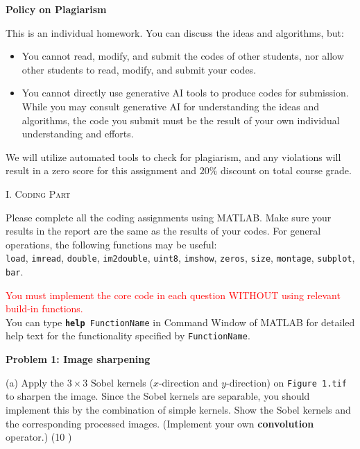 \documentclass[A4paper, 11pt]{article}
\newcommand{\<}{\,\langle\,}
\renewcommand{\>}{\,\rangle}
\newcommand{\Pro}[1]{\textbf{\large{Problem #1}} \vspace*{1ex}}
\newcommand{\Pt}[1]{\textcolor{emph}{(#1 \ifthenelse{\equal{#1}{1}}{point}{points})}}
\newcommand{\0}{\mathbf{0}}
\newcommand{\1}{\mathbf{1}}
\begin{document}
\begin{spacing}{1.3}
\vspace*{2ex}
\textbf{\large{Policy on Plagiarism}}
\vspace*{1.5ex}

This is an individual homework. You can discuss the ideas and algorithms, but:
\begin{itemize} \setlength{\parskip}{0.5ex} \vspace*{-1.5ex}
    \item You cannot read, modify, and submit the codes of other students, nor allow other students to read, modify, and submit your codes.
    \item You cannot directly use generative AI tools to produce codes for submission. While you may consult generative AI for understanding the ideas and algorithms, the code you submit must be the result of your own individual understanding and efforts.
\end{itemize} \vspace*{-1.5ex}
We will utilize automated tools to check for plagiarism, and any violations will result in a zero score for this assignment and $20\%$ discount on total course grade.

\newpage

\begin{center}
    \textsc{I. Coding Part}
\end{center}

Please complete all the coding assignments using MATLAB. Make sure your results in the report are the same as the results of your codes. For general operations, the following functions may be useful:\\
\texttt{load}, \texttt{imread}, \texttt{double}, \texttt{im2double}, \texttt{uint8}, \texttt{imshow}, \texttt{zeros}, \texttt{size}, \texttt{montage}, \texttt{subplot}, \texttt{bar}.

\textcolor{red}{You must implement the core code in each question WITHOUT using relevant build-in functions.}\\


\vspace*{-3.75ex}
You can type \texttt{\textbf{help} FunctionName} in Command Window of MATLAB for detailed help text for the functionality specified by \texttt{FunctionName}.

\vspace*{6ex}

\Pro{1: Image sharpening}

(a) Apply the $3\times 3$ Sobel kernels ($x$-direction and $y$-direction) on \texttt{Figure 1.tif} to sharpen the image. Since the Sobel kernels are separable, you should implement this by the combination of simple kernels. Show the Sobel kernels and the corresponding processed images. (Implement your own \textbf{convolution} operator.) \Pt{10}


\end{spacing}
\end{document}
